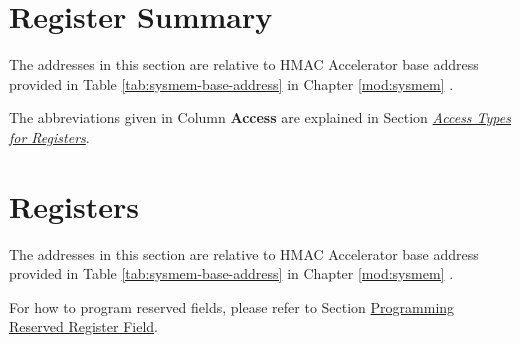 \documentclass[main\_\_EN.tex]{subfiles}
\begin{document}



\newpage
\hypertarget{hmac-reg-summ}{}
\section{Register Summary}
\label{sec:hmac-reg-summ}

The addresses in this section are relative to HMAC Accelerator base address provided in Table \ref{tab:sysmem-base-address} in Chapter \ref{mod:sysmem} \textit{}.

The abbreviations given in Column \textbf{Access} are explained in Section \hyperref[glossary-access-types]{\textit{Access Types for Registers}}.






\newpage
\section{Registers}

The addresses in this section are relative to HMAC Accelerator base address provided in Table \ref{tab:sysmem-base-address} in Chapter \ref{mod:sysmem} \textit{}.

For how to program reserved fields, please refer to Section \hyperref[programming-reserved-field]{Programming Reserved Register Field}.


\end{document}

